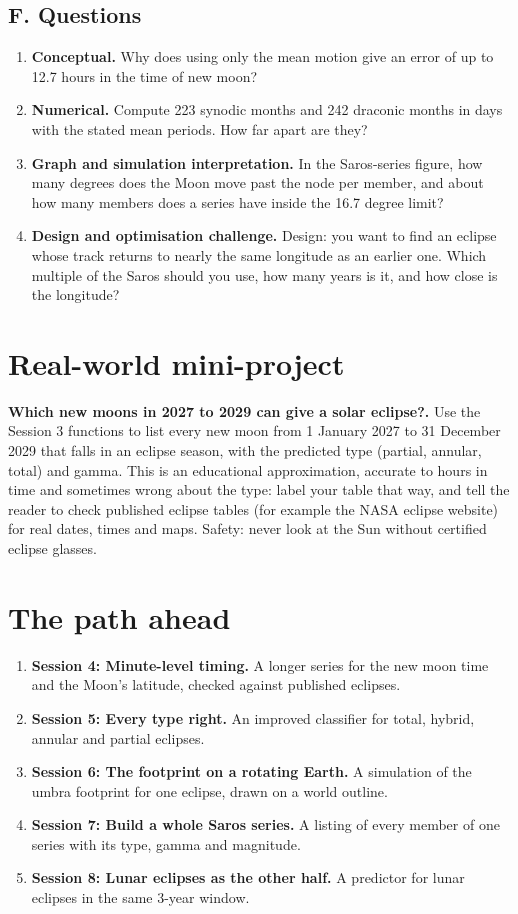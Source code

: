 \documentclass[11pt,a4paper]{article}
\begin{document}
\subsection*{F. Questions}
\begin{enumerate}[nosep]
\item \textbf{Conceptual.} Why does using only the mean motion give an error of up to 12.7 hours in the time of new moon?
\item \textbf{Numerical.} Compute 223 synodic months and 242 draconic months in days with the stated mean periods. How far apart are they?
\item \textbf{Graph and simulation interpretation.} In the Saros-series figure, how many degrees does the Moon move past the node per member, and about how many members does a series have inside the 16.7 degree limit?
\item \textbf{Design and optimisation challenge.} Design: you want to find an eclipse whose track returns to nearly the same longitude as an earlier one. Which multiple of the Saros should you use, how many years is it, and how close is the longitude?
\end{enumerate}

\section{Real-world mini-project}
\textbf{Which new moons in 2027 to 2029 can give a solar eclipse?.} Use the Session 3 functions to list every new moon from 1 January 2027 to 31 December 2029 that falls in an eclipse season, with the predicted type (partial, annular, total) and gamma. This is an educational approximation, accurate to hours in time and sometimes wrong about the type: label your table that way, and tell the reader to check published eclipse tables (for example the NASA eclipse website) for real dates, times and maps. Safety: never look at the Sun without certified eclipse glasses.

\section{The path ahead}
\begin{enumerate}[nosep]
\item \textbf{Session 4: Minute-level timing.} A longer series for the new moon time and the Moon's latitude, checked against published eclipses.
\item \textbf{Session 5: Every type right.} An improved classifier for total, hybrid, annular and partial eclipses.
\item \textbf{Session 6: The footprint on a rotating Earth.} A simulation of the umbra footprint for one eclipse, drawn on a world outline.
\item \textbf{Session 7: Build a whole Saros series.} A listing of every member of one series with its type, gamma and magnitude.
\item \textbf{Session 8: Lunar eclipses as the other half.} A predictor for lunar eclipses in the same 3-year window.
\end{enumerate}
\end{document}
